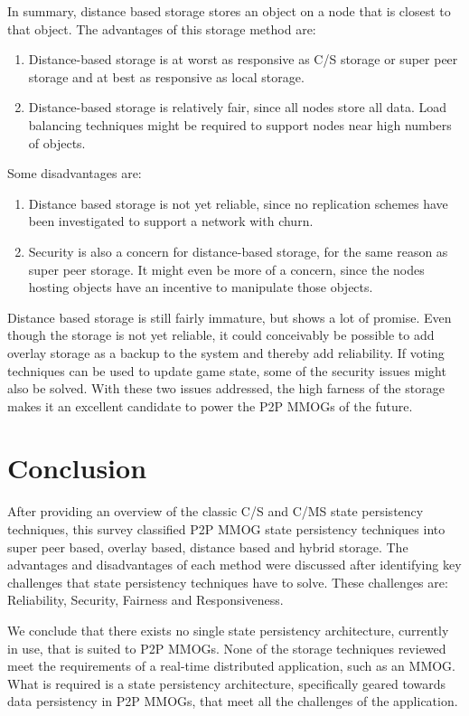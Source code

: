 \documentclass[10pt,a4paper,journal,cspaper,compsoc]{IEEEtran}
\begin{document}
In summary, distance based storage stores an object on a node that is closest to that object. The advantages of this storage method are:
%
\begin{enumerate}
    \item Distance-based storage is at worst as responsive as C/S storage or super peer storage and at best as responsive as local storage.
    \item Distance-based storage is relatively fair, since all nodes store all data. Load balancing techniques might be required to support nodes
        near high numbers of objects.
\end{enumerate}

Some disadvantages are:
%
\begin{enumerate}
    \item Distance based storage is not yet reliable, since no replication schemes have been investigated to support a network with churn.
    \item Security is also a concern for distance-based storage, for the same reason as super peer storage. It might even be more of a concern,
        since the nodes hosting objects have an incentive to manipulate those objects.
\end{enumerate}

Distance based storage is still fairly immature, but shows a lot of promise. Even though the storage is not yet reliable, it could conceivably be
possible to add overlay storage as a backup to the system and thereby add reliability. If voting techniques can be used to update game state, some of
the security issues might also be solved. With these two issues addressed, the high farness of the storage makes it an excellent candidate to power
the P2P MMOGs of the future.

\section{Conclusion}

After providing an overview of the classic C/S and C/MS state persistency techniques, this survey classified P2P MMOG state persistency techniques
into super peer based, overlay based, distance based and hybrid storage. The advantages and disadvantages of each method were discussed after
identifying key challenges that state persistency techniques have to solve. These challenges are: Reliability, Security, Fairness and Responsiveness.

We conclude that there exists no single state persistency architecture, currently in use, that is suited to P2P MMOGs. None of the storage techniques
reviewed meet the requirements of a real-time distributed application, such as an MMOG. What is required is a state persistency architecture,
specifically geared towards data persistency in P2P MMOGs, that meet all the challenges of the application.
\end{document}
